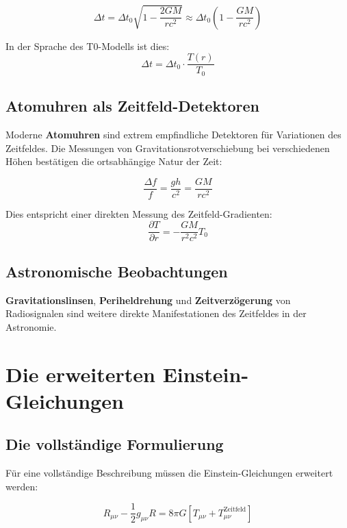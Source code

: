 \documentclass[12pt,a4paper]{report}
\begin{document}
	\begin{equation}
		\Delta t = \Delta t_0 \sqrt{1 - \frac{2GM}{rc^2}} \approx \Delta t_0 \left(1 - \frac{GM}{rc^2}\right)
	\end{equation}
	
	In der Sprache des T0-Modells ist dies:
	\begin{equation}
		\Delta t = \Delta t_0 \cdot \frac{T(r)}{T_0}
	\end{equation}
	
	\subsection{Atomuhren als Zeitfeld-Detektoren}
	
	Moderne \textbf{Atomuhren} sind extrem empfindliche Detektoren für Variationen des Zeitfeldes. Die Messungen von Gravitationsrotverschiebung bei verschiedenen Höhen bestätigen die ortsabhängige Natur der Zeit:
	
	\begin{equation}
		\frac{\Delta f}{f} = \frac{gh}{c^2} = \frac{GM}{rc^2}
	\end{equation}
	
	Dies entspricht einer direkten Messung des Zeitfeld-Gradienten:
	\begin{equation}
		\frac{\partial T}{\partial r} = -\frac{GM}{r^2c^2} T_0
	\end{equation}
	
	\subsection{Astronomische Beobachtungen}
	
	\textbf{Gravitationslinsen}, \textbf{Periheldrehung} und \textbf{Zeitverzögerung} von Radiosignalen sind weitere direkte Manifestationen des Zeitfeldes in der Astronomie.
	
	\section{Die erweiterten Einstein-Gleichungen}
	
	\subsection{Die vollständige Formulierung}
	
	Für eine vollständige Beschreibung müssen die Einstein-Gleichungen erweitert werden:
	
	\begin{equation}
		R_{\mu\nu} - \frac{1}{2}g_{\mu\nu}R = 8\pi G[T_{\mu\nu} + T_{\mu\nu}^{\text{Zeitfeld}}]
	\end{equation}
	
\end{document}
